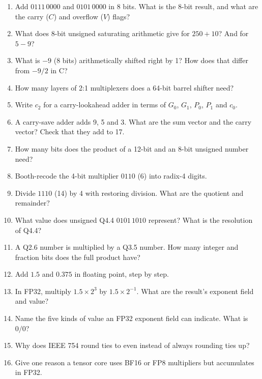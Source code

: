 \begin{enumerate}
  \item Add $0111\,0000$ and $0101\,0000$ in 8 bits. What is the 8-bit result, and what are the carry ($C$) and overflow ($V$) flags?
  \item What does 8-bit unsigned saturating arithmetic give for $250 + 10$? And for $5 - 9$?
  \item What is $-9$ (8 bits) arithmetically shifted right by 1? How does that differ from $-9/2$ in C?
  \item How many layers of 2:1 multiplexers does a 64-bit barrel shifter need?
  \item Write $c_2$ for a carry-lookahead adder in terms of $G_0$, $G_1$, $P_0$, $P_1$ and $c_0$.
  \item A carry-save adder adds 9, 5 and 3. What are the sum vector and the carry vector? Check that they add to 17.
  \item How many bits does the product of a 12-bit and an 8-bit unsigned number need?
  \item Booth-recode the 4-bit multiplier $0110$ (6) into radix-4 digits.
  \item Divide $1110$ (14) by 4 with restoring division. What are the quotient and remainder?
  \item What value does unsigned Q4.4 $0101\,1010$ represent? What is the resolution of Q4.4?
  \item A Q2.6 number is multiplied by a Q3.5 number. How many integer and fraction bits does the full product have?
  \item Add $1.5$ and $0.375$ in floating point, step by step.
  \item In FP32, multiply $1.5 \times 2^{3}$ by $1.5 \times 2^{-1}$. What are the result's exponent field and value?
  \item Name the five kinds of value an FP32 exponent field can indicate. What is $0/0$?
  \item Why does IEEE 754 round ties to even instead of always rounding ties up?
  \item Give one reason a tensor core uses BF16 or FP8 multipliers but accumulates in FP32.
\end{enumerate}

